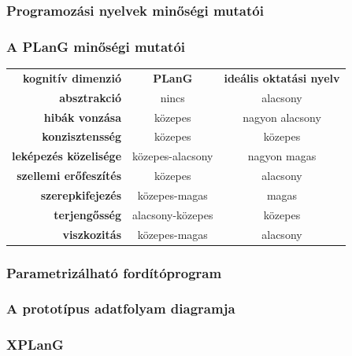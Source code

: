 \documentclass[xcolor=table]{beamer}
\begin{document}
\begin{frame}
	\frametitle{Programozási nyelvek minőségi mutatói}
	\centering
	\begin{adjustbox}{max totalsize={\textwidth}{\textheight},center}
	
	\end{adjustbox}
\end{frame}

\begin{frame}
	\frametitle{A PLanG minőségi mutatói}
	\centering
	\begin{tabular}{ r c c }
\bfseries kognitív dimenzió						& \bfseries PLanG	 & \bfseries ideális oktatási nyelv  \\
\rowcolor{red!30}		\bfseries absztrakció 		&nincs & alacsony \\
\rowcolor{red!30}		\bfseries hibák vonzása 	&közepes & nagyon alacsony \\
\rowcolor{green!30}		\bfseries konzisztensség 	&közepes & közepes  \\
\rowcolor{red!30}		\bfseries leképezés közelisége &közepes-alacsony & nagyon magas \\
\rowcolor{red!30}		\bfseries szellemi erőfeszítés &közepes & alacsony \\
\rowcolor{yellow!30}		\bfseries szerepkifejezés &közepes-magas	& magas \\
\rowcolor{yellow!30}		\bfseries terjengősség &alacsony-közepes	& közepes \\
\rowcolor{red!30}		\bfseries viszkozitás &közepes-magas	& alacsony
	\end{tabular}
\end{frame}


\begin{frame}
	\frametitle{Parametrizálható fordítóprogram}
	\centering
	\begin{adjustbox}{max totalsize={\textwidth}{\textheight},center}
	
	\end{adjustbox}
\end{frame}

\begin{frame}
	\frametitle{A prototípus adatfolyam diagramja}
	\centering
	\begin{adjustbox}{max totalsize={\textwidth}{\textheight},center}
	
	\end{adjustbox}
\end{frame}


\begin{frame}[fragile]
	\frametitle{XPLanG}
	\centering
	\begin{adjustbox}{max totalsize={\textwidth}{\textheight},center}
	
	\end{adjustbox}
\end{frame}
\end{document}
